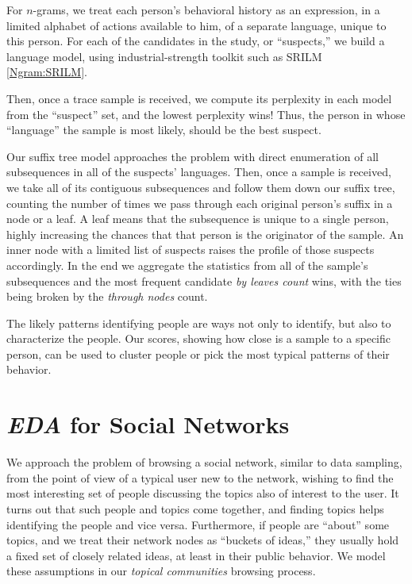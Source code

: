 \documentclass[10pt,oneside]{memoir}
\begin{document}
For $n$-grams, we treat each person's behavioral history as an expression, in a limited alphabet of actions available to him, of a separate language, unique to this person.  For each of the candidates in the study, or ``suspects,'' we build a language model, using industrial-strength toolkit such as SRILM \ref{Ngram:SRILM}.


Then, once a trace sample is received, we compute its perplexity in each model from the ``suspect'' set, and the lowest perplexity wins!  Thus, the person in whose ``language'' the sample is most likely, should be the best suspect.


Our suffix tree model approaches the problem with direct enumeration of all subsequences in all of the suspects' languages.  Then, once a sample is received, we take all of its contiguous subsequences and follow them down our suffix tree, counting the number of times we pass through each original person's suffix in a node or a leaf.  A leaf means that the subsequence is unique to a single person, highly increasing the chances that that person is the originator of the sample.  An inner node with a limited list of suspects raises the profile of those suspects accordingly.  In the end we aggregate the statistics from all of the sample's subsequences and the most frequent candidate {\itshape by leaves count} wins, with the ties being broken by the {\itshape through nodes} count.


The likely patterns identifying people are ways not only to identify, but also to characterize the people.  Our scores, showing how close is a sample to a specific person, can be used to cluster people or pick the most typical patterns of their behavior.


\pagebreak \section{{\itshape EDA} for Social Networks}
\label{eda_forsocialnetworks}

We approach the problem of browsing a social network, similar to data sampling, from the point of view of a typical user new to the network, wishing to find the most interesting set of people discussing the topics also of interest to the user.  It turns out that such people and topics come together, and finding topics helps identifying the people and vice versa.  Furthermore, if people are ``about'' some topics, and we treat their network nodes as ``buckets of ideas,'' they usually hold a fixed set of closely related ideas, at least in their public behavior.  We model these assumptions in our {\itshape topical communities} browsing process.
\end{document}
